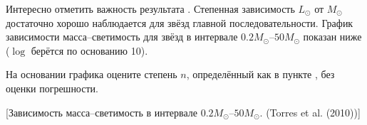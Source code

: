 Интересно отметить важность результата . Степенная зависимость $L_\odot$ от $M_\odot$ достаточно хорошо наблюдается для звёзд главной последовательности. График зависимости масса--светимость для звёзд в интервале $0.2M_\odot$--$50M_\odot$ показан ниже ($\log$ берётся по основанию 10).

\begin{task}
    \item На основании графика оцените степень $n$, определённый как в пункте , без оценки погрешности.
\end{task}

[Зависимость масса--светимость в интервале $0.2M_\odot$--$50M_\odot$. (Torres et al. (2010))]
